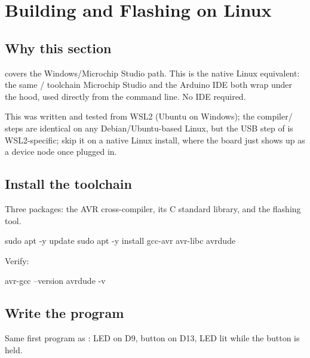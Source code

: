 
\section{Building and Flashing on Linux}
\label{c2:sec:linux}\label{c2:app:d}

\subsection{Why this section}
\label{c2:d:1}
 covers the Windows/Microchip Studio path. This is the native Linux equivalent:
the same / toolchain Microchip Studio and the Arduino IDE both wrap
under the hood, used directly from the command line. No IDE required.

This was written and tested from WSL2 (Ubuntu on Windows); the compiler/ steps are
identical on any Debian/Ubuntu-based Linux, but the USB step of  is WSL2-specific;
skip it on a native Linux install, where the board just shows up as a device node once plugged in.

\subsection{Install the toolchain}
\label{c2:d:2}
Three packages: the AVR cross-compiler, its C standard library, and the flashing tool.

\begin{shell}
sudo apt -y update
sudo apt -y install gcc-avr avr-libc avrdude
\end{shell}

\noindent Verify:

\begin{shell}
avr-gcc --version
avrdude -v
\end{shell}

\subsection{Write the program}
\label{c2:d:3}
Same first program as : LED on D9, button on D13, LED lit while the button is held.

